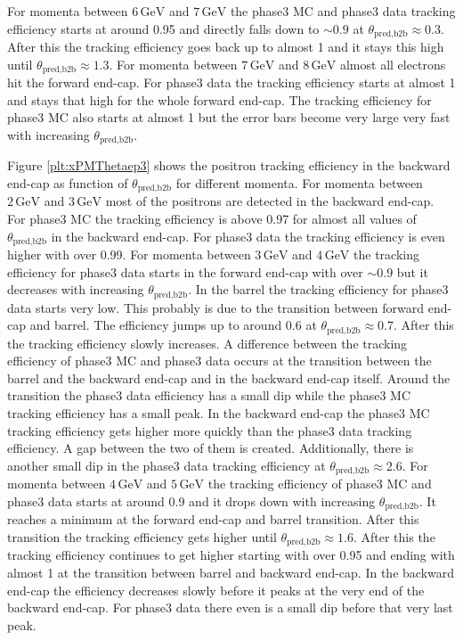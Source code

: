 \documentclass[a4paper,11pt,twosided,final,german,openbib,pdftex,listof=totoc,bibliography=totoc]{scrbook}
\begin{document}
For momenta between $6\,\textrm{GeV}$ and $7\,\textrm{GeV}$ the phase3 MC and phase3 data tracking efficiency starts at around 0.95 and directly falls down to $\sim 0.9$ at $\theta_{\textrm{pred,b2b}} \approx 0.3$. After this the tracking efficiency goes back up to almost 1 and it stays this high until $\theta_{\textrm{pred,b2b}} \approx 1.3$.
For momenta between $7\,\textrm{GeV}$ and $8\,\textrm{GeV}$ almost all electrons hit the forward end-cap. For phase3 data the tracking efficiency starts at almost 1 and stays that high for the whole forward end-cap. The tracking efficiency for phase3 MC also starts at almost 1 but the error bars become very large very fast with increasing $\theta_{\textrm{pred,b2b}}$.

Figure \ref{plt:xPMThetaep3} shows the positron tracking efficiency in the backward end-cap as function of $\theta_{\textrm{pred,b2b}}$ for different momenta.
For momenta between $2\,\textrm{GeV}$ and $3\,\textrm{GeV}$ most of the positrons are detected in the backward end-cap. For phase3 MC the tracking efficiency is above 0.97 for almost all values of $\theta_{\textrm{pred,b2b}}$ in the backward end-cap. For phase3 data the tracking efficiency is even higher with over 0.99.
For momenta between $3\,\textrm{GeV}$ and $4\,\textrm{GeV}$ the tracking efficiency for phase3 data starts in the forward end-cap with over $\sim 0.9$ but it decreases with increasing $\theta_{\textrm{pred,b2b}}$. In the barrel the tracking efficiency for phase3 data starts very low. This probably is due to the transition between forward end-cap and barrel. The efficiency jumps up to around 0.6 at $\theta_{\textrm{pred,b2b}} \approx 0.7$. After this the tracking efficiency slowly increases. A difference between the tracking efficiency of phase3 MC and phase3 data occurs at the transition between the barrel and the backward end-cap and in the backward end-cap itself. Around the transition the phase3 data efficiency has a small dip while the phase3 MC tracking efficiency has a small peak. In the backward end-cap the phase3 MC tracking efficiency gets higher more quickly than the phase3 data tracking efficiency. A gap between the two of them is created. Additionally, there is another small dip in the phase3 data tracking efficiency at $\theta_{\textrm{pred,b2b}} \approx 2.6$. 
For momenta between $4\,\textrm{GeV}$ and $5\,\textrm{GeV}$ the tracking efficiency of phase3 MC and phase3 data starts at around 0.9 and it drops down with increasing $\theta_{\textrm{pred,b2b}}$. It reaches a minimum at the forward end-cap and barrel transition. After this transition the tracking efficiency gets higher until $\theta_{\textrm{pred,b2b}} \approx 1.6$. After this the tracking efficiency continues to get higher starting with over 0.95 and ending with almost 1 at the transition between barrel and backward end-cap. In the backward end-cap the efficiency decreases slowly before it peaks at the very end of the backward end-cap. For phase3 data there even is a small dip before that very last peak.
\end{document}
